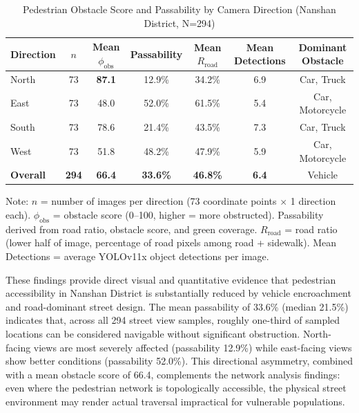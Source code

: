 \documentclass[10pt,conference,compsoc]{IEEEtran}
\begin{document}
\begin{table}[htbp]
\begin{center}
\begin{table}[htbp]
\caption{Pedestrian Obstacle Score and Passability by Camera Direction (Nanshan District, N=294)}
\label{tab:sim_by_direction}
\begin{center}
\begin{threeparttable}
\begin{tabular}{lcccccc}
\toprule
Direction & $n$ & Mean $\phi_{\text{obs}}$ & Passability & Mean $R_{\text{road}}$ & Mean Detections & Dominant Obstacle \\
\midrule
North & 73 & \textbf{87.1} & 12.9\% & 34.2\% & 6.9 & Car, Truck \\
East & 73 & 48.0 & 52.0\% & 61.5\% & 5.4 & Car, Motorcycle \\
South & 73 & 78.6 & 21.4\% & 43.5\% & 7.3 & Car, Truck \\
West & 73 & 51.8 & 48.2\% & 47.9\% & 5.9 & Car, Motorcycle \\
\midrule
\textbf{Overall} & \textbf{294} & \textbf{66.4} & \textbf{33.6\%} & \textbf{46.8\%} & \textbf{6.4} & Vehicle \\
\bottomrule
\end{tabular}
\begin{tablenotes}
\item Note: $n$ = number of images per direction (73 coordinate points $\times$ 1 direction each). $\phi_{\text{obs}}$ = obstacle score (0--100, higher = more obstructed). Passability derived from road ratio, obstacle score, and green coverage. $R_{\text{road}}$ = road ratio (lower half of image, percentage of road pixels among road + sidewalk). Mean Detections = average YOLOv11x object detections per image.
\end{tablenotes}
\end{threeparttable}
\end{center}
\end{table}

These findings provide direct visual and quantitative evidence that pedestrian accessibility in Nanshan District is substantially reduced by vehicle encroachment and road-dominant street design. The mean passability of 33.6\% (median 21.5\%) indicates that, across all 294 street view samples, roughly one-third of sampled locations can be considered navigable without significant obstruction. North-facing views are most severely affected (passability 12.9\%) while east-facing views show better conditions (passability 52.0\%). This directional asymmetry, combined with a mean obstacle score of 66.4, complements the network analysis findings: even where the pedestrian network is topologically accessible, the physical street environment may render actual traversal impractical for vulnerable populations.


\end{center}
\end{table}
\end{document}

